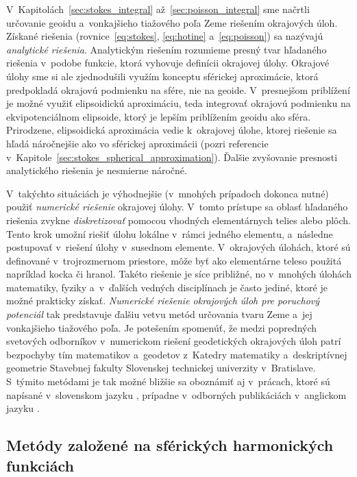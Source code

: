 \documentclass[a4paper, 12pt]{book}
\begin{document}
V~Kapitolách~\ref{sec:stokes_integral} až~\ref{sec:poisson_integral} sme 
načrtli určovanie geoidu a~vonkajšieho tiažového poľa Zeme riešením okrajových 
úloh.  Získané riešenia (rovnice~\ref{eq:stokes}, \ref{eq:hotine} 
a~\ref{eq:poisson}) sa nazývajú \emph{analytické riešenia}.  Analytickým 
riešením rozumieme presný tvar hľadaného riešenia v~podobe funkcie, ktorá 
vyhovuje definícii okrajovej úlohy.  Okrajové úlohy sme si ale zjednodušili 
využím konceptu sférickej aproximácie, ktorá predpokladá okrajovú podmienku na 
sfére, nie na geoide.  V~presnejšom priblížení je možné využiť elipsoidickú 
aproximáciu, teda integrovať okrajovú podmienku na ekvipotenciálnom elipsoide, 
ktorý je lepším priblížením geoidu ako sféra.  Prirodzene, elipsoidická 
aproximácia vedie k~okrajovej úlohe, ktorej riešenie sa hľadá náročnejšie ako 
vo sférickej aproximácii (pozri referencie 
v~Kapitole~\ref{sec:stokes_spherical_approximation}).  Ďalšie zvyšovanie 
presnosti analytického riešenia je nesmierne náročné.

V~takýchto situáciách je výhodnejšie (v~mnohých prípadoch dokonca nutné) použiť 
\emph{numerické riešenie} okrajovej úlohy.  V~tomto prístupe sa oblasť 
hľadaného riešenia zvykne \emph{diskretizovať} pomocou vhodných elementárnych 
telies alebo plôch.  Tento krok umožní riešiť úlohu lokálne v~rámci jedného 
elementu, a~následne postupovať v~riešení úlohy v~susednom elemente.  
V~okrajových úlohách, ktoré sú definované v~trojrozmernom priestore, môže byť 
ako elementárne teleso použitá napríklad kocka či hranol.  Takéto riešenie je 
síce približné, no v~mnohých úlohách matematiky, fyziky a~v~ďalších vedných 
disciplínach je často jediné, ktoré je možné prakticky získať.  \emph{Numerické 
riešenie okrajových úloh pre poruchový potenciál} tak predstavuje ďalšiu vetvu 
metód určovania tvaru Zeme a~jej vonkajšieho tiažového poľa.  Je potešením 
spomenúť, že medzi popredných svetových odborníkov v~numerickom riešení 
geodetických okrajových úloh patrí bezpochyby tím matematikov a~geodetov 
z~Katedry matematiky a~deskriptívnej geometrie Stavebnej fakulty Slovenskej 
technickej univerzity v~Bratislave.  S~týmito metódami je tak možné bližšie sa 
oboznámiť aj v~prácach, ktoré sú napísané v~slovenskom jazyku 
\parencite[napríklad][]{Janak2006,Macak2021}, prípadne v~odborných publikáciách 
v~anglickom jazyku 
\parencite[napríklad][]{Cunderlik2008,Faskova2010,Macak2014}.


\subsection{Metódy založené na sférických harmonických funkciách}
\end{document}
